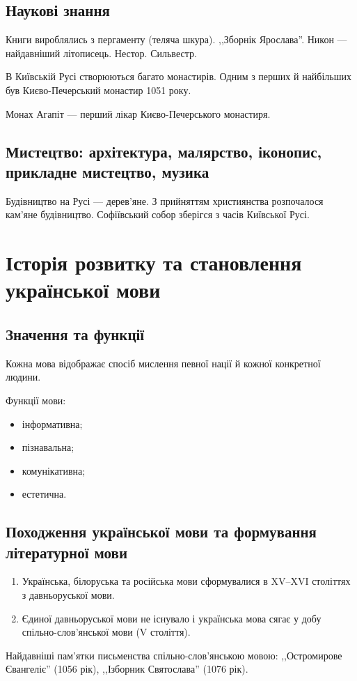 \documentclass[a5paper,10pt,titlepage,pdftex,headsepline]{scrartcl}
\begin{document}
\subsection{Наукові знання}
Книги вироблялись з пергаменту (теляча шкура).
,,Зборнік Ярослава''. Никон --- найдавніший літописець. Нестор. Сильвестр.

В Київській Русі створюються багато монастирів.
Одним з перших й найбільших був Києво-Печерський монастир 1051 року.

Монах Агапіт --- перший лікар Києво-Печерського монастиря.
\subsection{Мистецтво: архітектура, малярство, іконопис, прикладне мистецтво, музика}
Будівництво на Русі --- дерев’яне.
З прийняттям християнства розпочалося кам’яне будівництво.
Софіївський собор зберігся з часів Київської Русі.
\section{Історія розвитку та становлення української мови}
\subsection{Значення та функції}
Кожна мова відображає спосіб мислення певної нації й кожної конкретної людини.

Функції мови:
\begin{itemize}
	\item інформативна;
	\item пізнавальна;
	\item комунікативна;
	\item естетична.
\end{itemize}
\subsection{Походження української мови та формування літературної мови}
\begin{enumerate}
	\item Українська, білоруська та російська мови сформувалися в XV--XVI століттях з давньоруської мови.
	\item Єдиної давньоруської мови не існувало і українська мова сягає у добу спільно-слов’янської мови (V століття).
\end{enumerate}

Найдавніші пам’ятки письменства спільно-слов’янською мовою:
,,Остромирове Євангеліє'' (1056 рік),
,,Ізборник Святослава'' (1076 рік).
\end{document}
